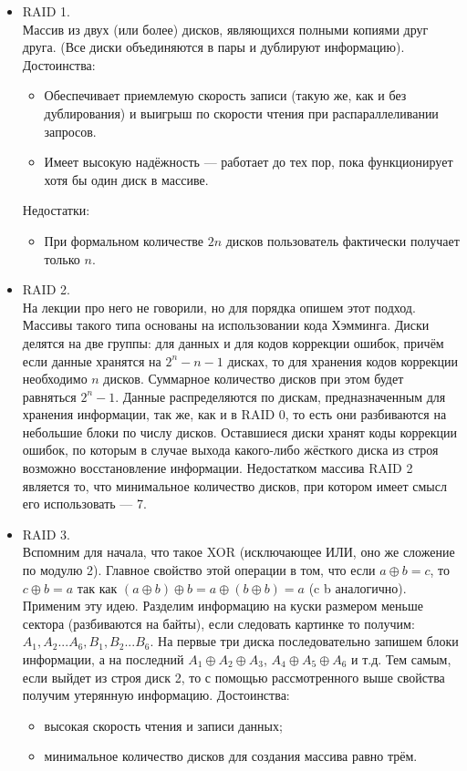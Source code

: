 \begin {itemize}
\item RAID 1. \\
Массив из двух (или более) дисков, являющихся полными копиями друг друга. (Все диски объединяются в пары и дублируют информацию).
Достоинства:
\begin {itemize}
\item Обеспечивает приемлемую скорость записи (такую же, как и без дублирования) и выигрыш по скорости чтения при распараллеливании запросов.
\item Имеет высокую надёжность — работает до тех пор, пока функционирует хотя бы один диск в массиве.
\end {itemize}

Недостатки:
\begin {itemize}
\item При формальном количестве $2n$ дисков пользователь фактически получает только $n$.
\end {itemize}

\item RAID 2. \\
На лекции про него не говорили, но для порядка опишем этот подход. Массивы такого типа основаны на использовании кода Хэмминга. Диски делятся на две группы: для данных и для кодов коррекции ошибок, причём если данные хранятся на $2^n - n- 1$ дисках, то для хранения кодов коррекции необходимо $n$ дисков. Суммарное количество дисков при этом будет равняться $2^n - 1$. Данные распределяются по дискам, предназначенным для хранения информации, так же, как и в RAID 0, то есть они разбиваются на небольшие блоки по числу дисков. Оставшиеся диски хранят коды коррекции ошибок, по которым в случае выхода какого-либо жёсткого диска из строя возможно восстановление информации. Недостатком массива RAID 2 является то, что минимальное количество дисков, при котором имеет смысл его использовать — 7.

\item RAID 3. \\
Вспомним для начала, что такое XOR (исключающее ИЛИ, оно же сложение по модулю 2). Главное свойство этой операции в том, что если 
$a \oplus b = c$, то $c \oplus b = a$ так как $(a \oplus b) \oplus b = a \oplus (b \oplus b) = a$ (c b аналогично). \\
Применим эту идею. Разделим информацию на куски размером меньше сектора (разбиваются на байты), если следовать картинке то получим: $A_1, A_2 ... A_6, B_1, B_2 ... B_6$. На первые три диска последовательно запишем блоки информации, а на последний $A_1 \oplus A_2 \oplus A_3$, $A_4 \oplus A_5 \oplus A_6$ и т.д. Тем самым, если выйдет из строя диск 2, то с помощью рассмотренного выше свойства получим утерянную информацию.
Достоинства:
\begin {itemize}
\item высокая скорость чтения и записи данных;
\item минимальное количество дисков для создания массива равно трём.
\end {itemize}


\end{itemize}
